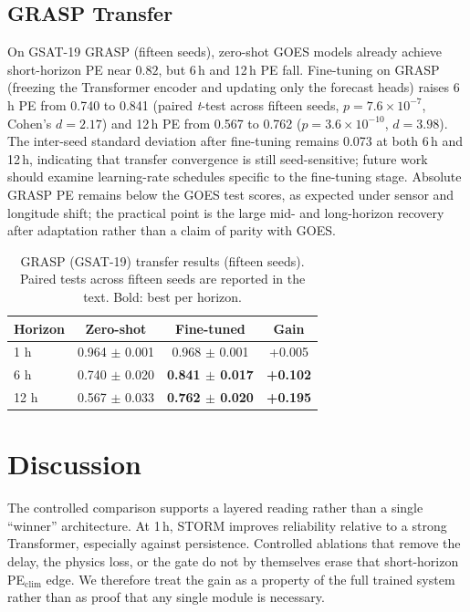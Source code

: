 \documentclass{ieeeaccess}
\begin{document}
\subsection{GRASP Transfer}
On GSAT-19 GRASP (fifteen seeds), zero-shot GOES models already achieve
short-horizon PE near \(0.82\), but 6\,h and 12\,h PE fall. Fine-tuning on GRASP (freezing the Transformer encoder and updating only the forecast heads) raises 6\,h PE from 0.740 to 0.841 (paired \textit{t}-test across fifteen seeds, \(p = 7.6\times10^{-7}\), Cohen's \(d = 2.17\)) and 12\,h PE from 0.567 to 0.762 (\(p = 3.6\times10^{-10}\), \(d = 3.98\)).
The inter-seed standard deviation after fine-tuning remains 0.073 at both 6\,h
and 12\,h, indicating that transfer convergence is still seed-sensitive; future
work should examine learning-rate schedules specific to the fine-tuning stage.
Absolute GRASP PE remains below
the GOES test scores, as expected under sensor and longitude shift; the
practical point is the large mid- and long-horizon recovery after
adaptation rather than a claim of parity with GOES.

\begin{table}[!htbp]
\centering
\caption{GRASP (GSAT-19) transfer results (fifteen seeds). Paired tests across fifteen seeds are reported in the text. Bold: best per horizon.}
\label{tab:grasp}
\begin{tabular}{lccc}
\toprule
Horizon & Zero-shot & Fine-tuned & Gain \\
\midrule
1 h  & 0.964 \(\pm\) 0.001 & 0.968 \(\pm\) 0.001 & +0.005 \\
6 h  & 0.740 \(\pm\) 0.020 & \textbf{0.841 \(\pm\) 0.017} & \textbf{+0.102} \\
12 h & 0.567 \(\pm\) 0.033 & \textbf{0.762 \(\pm\) 0.020} & \textbf{+0.195} \\
\bottomrule
\end{tabular}
\end{table}


\section{Discussion}
\label{sec:discussion}
The controlled comparison supports a layered reading rather than a single
``winner'' architecture. At 1\,h, STORM improves reliability relative to a strong Transformer,
especially against persistence. Controlled ablations that remove the delay, the physics loss, or the gate do not by themselves erase that short-horizon PE\(_{\mathrm{clim}}\) edge. We therefore treat the gain as a property of the full trained system rather than as proof that any single module is necessary.
\end{document}
